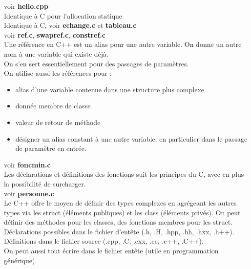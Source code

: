  voir \textbf{hello.cpp} \\

 Identique à C pour l'allocation statique \\

 Identique à C, voir \textbf{echange.c} et \textbf{tableau.c} \\

 voir \textbf{ref.c}, \textbf{swapref.c}, \textbf{constref.c} \\
Une référence en C++ est un alias pour une autre variable. On donne un autre nom à une variable qui existe déjà. \\
On s'en sert essentiellement pour des passages de paramètres.\\
On utilise aussi les références pour :
\begin{itemize}
	\item alias d'une variable contenue dans une structure plus complexe
	\item donnée membre de classe
	\item valeur de retour de méthode
	\item désigner un alias constant à une autre variable, en particulier dans le passage de paramètre en entrée.
\end{itemize}

 voir \textbf{foncmin.c} \\ Les déclarations et définitions des fonctions suit les principes du C, avec en plus la possibilité de surcharger. \\

 voir \textbf{personne.c} \\
	Le C++ offre le moyen de définir des types complexes en agrégeant les autres types via les struct (éléments publiques) et les class (éléments privés). On peut définir des méthodes pour les classes, des fonctions membres pour les struct. \\
	Déclarations possibles dans le fichier d'entête (.h, .H, .hpp, .hh, .hxx, .h++).\\
	Définitions dans le fichier source (.cpp, .C, .cxx, .cc, .c++, .C++).\\
	On peut aussi tout écrire dans le fichier entête (utile en programmation générique).\\

